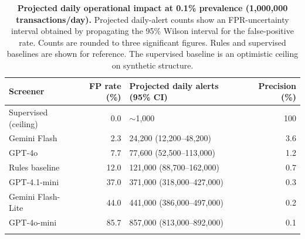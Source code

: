 \documentclass[pdflatex,sn-basic,Numbered]{sn-jnl}
\newcommand{\HLtag}[1]{{\color{HLink}\bfseries [#1]~}}
\renewcommand{\HLtag}[1]{}}}
\begin{document}
\begin{table}[t]
\caption{\HLtag{Revised in revision}\textbf{Projected daily operational impact at 0.1\% prevalence (1,000,000 transactions/day).} Projected daily-alert counts show an FPR-uncertainty interval obtained by propagating the 95\% Wilson interval for the false-positive rate. Counts are rounded to three significant figures. Rules and supervised baselines are shown for reference. The supervised baseline is an optimistic ceiling on synthetic structure.}\label{tab:vol}
\begin{tabular}{@{}lrlr@{}}
\toprule
Screener & FP rate (\%) & Projected daily alerts (95\% CI) & Precision (\%) \\
\midrule
Supervised (ceiling) & 0.0  & $\sim$1{,}000                    & 100 \\
Gemini Flash         & 2.3 & 24{,}200 (12{,}200--48{,}200) & 3.6 \\
GPT-4o               & 7.7 & 77{,}600 (52{,}500--113{,}000) & 1.2 \\
Rules baseline       & 12.0 & 121{,}000 (88{,}700--162{,}000) & 0.7 \\
GPT-4.1-mini         & 37.0 & 371{,}000 (318{,}000--427{,}000) & 0.3 \\
Gemini Flash-Lite    & 44.0 & 441{,}000 (386{,}000--497{,}000) & 0.2 \\
GPT-4o-mini          & 85.7 & 857{,}000 (813{,}000--892{,}000) & 0.1 \\
\botrule
\end{tabular}
\end{table}
\end{document}
